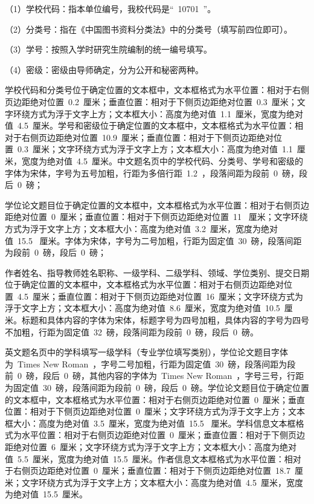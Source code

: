 （1）学校代码：指本单位编号，我校代码是“~10701~”。

（2）分类号：指在《中国图书资料分类法》中的分类号（填写前四位即可）。

（3）学号：按照入学时研究生院编制的统一编号填写。

（4）密级：密级由导师确定，分为公开和秘密两种。

学校代码和分类号位于确定位置的文本框中，文本框格式为水平位置：相对于右侧页边距绝对位置~0.2~厘米；垂直位置：相对于下侧页边距绝对位置~0.3~厘米；文字环绕方式为浮于文字上方；文本框大小：高度为绝对值~1.1~厘米，宽度为绝对值~4.5~厘米。学号和密级位于确定位置的文本框中，文本框格式为水平位置：相对于右侧页边距绝对位置~10.9~厘米；垂直位置：相对于下侧页边距绝对位置~0.3~厘米；文字环绕方式为浮于文字上方；文本框大小：高度为绝对值~1.1~厘米，宽度为绝对值~4.5~厘米。中文题名页中的学校代码、分类号、学号和密级的字体为宋体，字号为五号加粗，行距为多倍行距~1.2~，段落间距为段前~0~磅，段后~0~磅；

学位论文题目位于确定位置的文本框中，文本框格式为水平位置：相对于右侧页边距绝对位置~0~厘米；垂直位置：相对于下侧页边距绝对位置~11~ 厘米；文字环绕方式为浮于文字上方；文本框大小：高度为绝对值~3.2~厘米，宽度为绝对值~15.5~ 厘米。字体为宋体，字号为二号加粗，行距为固定值~30~磅，段落间距为段前~0~磅，段后~0~磅；

作者姓名、指导教师姓名职称、一级学科、二级学科、领域、学位类别、提交日期位于确定位置的文本框中，文本框格式为水平位置：相对于右侧页边距绝对位置~4.5~厘米；垂直位置：相对于下侧页边距绝对位置~16~厘米；文字环绕方式为浮于文字上方；文本框大小：高度为绝对值~8.6~厘米，宽度为绝对值~10.5~厘米。标题和具体内容的字体为宋体，标题字号为四号加粗，具体内容的字号为四号不加粗，行距为固定值~32~磅，段落间距为段前~0~磅，段后~0~磅。

英文题名页中的学科填写一级学科（专业学位填写类别），学位论文题目字体为~Times New Roman~，字号二号加粗，行距为固定值~30~磅，段落间距为段前~0~磅，段后~0~磅，其他内容的字体为~Times New Roman~，字号三号，行距为固定值~30~磅，段落间距为段前~0~磅，段后~0~磅。学位论文题目位于确定位置的文本框中，文本框格式为水平位置：相对于右侧页边距绝对位置~0~厘米；垂直位置：相对于下侧页边距绝对位置~0~厘米；文字环绕方式为浮于文字上方；文本框大小：高度为绝对值~3.5~厘米，宽度为绝对值~15.5~ 厘米。学科信息文本框格式为水平位置：相对于右侧页边距绝对位置~0~厘米；垂直位置：相对于下侧页边距绝对位置~6~厘米；文字环绕方式为浮于文字上方；文本框大小：高度为绝对值~5.5~厘米，宽度为绝对值~15.5~厘米。作者信息文本框格式为水平位置：相对于右侧页边距绝对位置~0~厘米；垂直位置：相对于下侧页边距绝对位置~18.7~厘米；文字环绕方式为浮于文字上方；文本框大小：高度为绝对值~4.5~厘米，宽度为绝对值~15.5~厘米。

